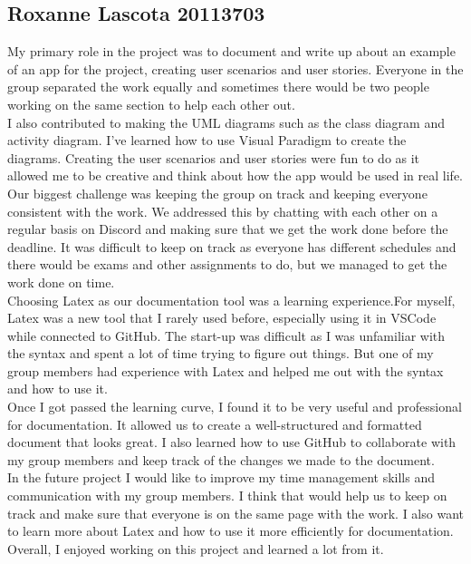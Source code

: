 \subsection*{Roxanne Lascota 20113703}
My primary role in the project was to document and write up about an example of an app for the project, creating user scenarios and user stories. Everyone 
in the group separated the work equally and sometimes there would be two people working on the same section to help each other out.\\
I also contributed to making the UML diagrams such as the class diagram and activity diagram. I've learned how to use Visual Paradigm to create the diagrams.
Creating the user scenarios and user stories were fun to do as it allowed me to be creative and think about how the app would be used in real life.\\

Our biggest challenge was keeping the group on track and keeping everyone consistent with the work.
We addressed this by chatting with each other on a regular basis on Discord and making sure that we get the work done before the deadline. It was difficult to keep on track as everyone has different schedules and there would be exams and other assignments to do, 
but we managed to get the work done on time. \\

Choosing Latex as our documentation tool was a learning experience.For myself, Latex was a new tool that I rarely used before, especially using it in VSCode while connected to GitHub. 
The start-up was difficult as I was unfamiliar with the syntax and spent a lot of time trying to figure out things. But one of my group members had experience with Latex and helped me out with the syntax and how to use it.\\

Once I got passed the learning curve, I found it to be very useful and professional for documentation. It allowed us to create a well-structured and formatted document that looks great. I also learned how to use GitHub to 
collaborate with my group members and keep track of the changes we made to the document.\\

In the future project I would like to improve my time management skills and communication with my group members. I think that would help us to keep on track and make sure 
that everyone is on the same page with the work. I also want to learn more about Latex and how to use it more efficiently for documentation. 
Overall, I enjoyed working on this project and learned a lot from it.

\pagebreak